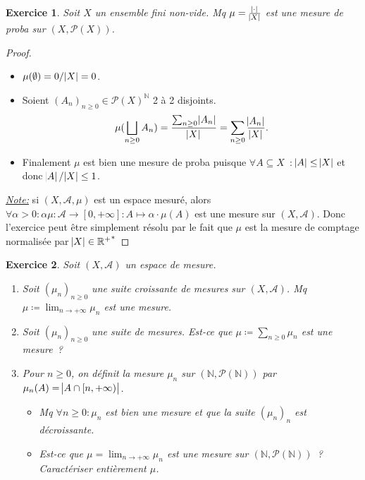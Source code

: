\documentclass{article}
\newtheorem{ex}{Exercice}[section]
\newcommand{\pinfty}{{+\infty}}
\newcommand{\N}{{\mathbb N}}
\newcommand{\R}{{\mathbb R}}
\begin{document}
\begin{ex} Soit $X$ un ensemble fini non-vide. Mq $\mu = \frac {\abs \cdot}{\abs X}$ est une mesure de proba sur $(X, \mathcal P(X))$.
\end{ex}

\begin{proof}~
\begin{itemize}
	\item $\mu(\emptyset) = 0/\abs X = 0$.
	\item Soient $(A_n)_{n \geq 0} \in \mathcal P(X)^\N$ 2 à 2 disjoints.
	\[\mu(\bigsqcup_{n \geq 0}A_n) = \frac {\sum_{n \geq 0}\abs {A_n}}{\abs X} = \sum_{n \geq 0}\frac {\abs {A_n}}{\abs X}.\]
	\item Finalement $\mu$ est bien une mesure de proba puisque $\forall A \subseteq X$~: $\abs A \leq \abs X$ et donc $\abs A/\abs X \leq 1$.
\end{itemize}

\underline {\textit{Note:}} si $(X, \mathcal A, \mu)$ est un espace mesuré, alors $\forall \alpha > 0 : \alpha\mu : \mathcal A \to [0, \pinfty] : A \mapsto \alpha \cdot \mu(A)$
est une mesure sur $(X, \mathcal A)$. Donc l'exercice peut être simplement résolu par le fait que $\mu$ est la mesure de comptage normalisée par $\abs X \in {\R^+}^*$
\end{proof}

\begin{ex} Soit $(X, \mathcal A)$ un espace de mesure.
\begin{enumerate}
	\item Soit $(\mu_n)_{n \geq 0}$ une suite croissante de mesures sur $(X, \mathcal A)$. Mq $\mu \coloneqq \lim_{n \to \pinfty}\mu_n$ est une mesure.
	\item Soit $(\mu_n)_{n \geq 0}$ une suite de mesures. Est-ce que $\mu \coloneqq \sum_{n \geq 0}\mu_n$ est une mesure~?
	\item Pour $n \geq 0$, on définit la mesure $\mu_n$ sur $(\N, \mathcal P(\N))$ par $\mu_n(A) = \abs {A \cap [n, \pinfty)}$.
	\begin{itemize}
		\item Mq $\forall n \geq 0 : \mu_n$ est bien une mesure et que la suite $(\mu_n)_n$ est décroissante.
		\item Est-ce que $\mu = \lim_{n \to \pinfty}\mu_n$ est une mesure sur $(\N, \mathcal P(\N))$~? Caractériser entièrement $\mu$.
	\end{itemize}
\end{enumerate}
\end{ex}
\end{document}

